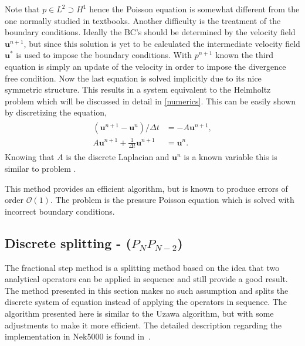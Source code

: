 Note that $p\in L^2\supset H^1$ hence the Poisson equation 
is somewhat different from the one normally studied in textbooks. Another difficulty is the 
treatment of the boundary conditions. Ideally the BC's should be determined by the velocity 
field $\mathbf{u}^{n+1}$, but since this solution is yet to be calculated the intermediate velocity field 
$\mathbf{u}^{*}$ is used to impose the boundary conditions. With $p^{n+1}$ known the third equation is 
simply an update of the velocity in order to impose the divergence free condition. Now the last
equation is solved implicitly due to its nice symmetric structure. This results in a system 
equivalent to the Helmholtz problem which will be discussed in detail in \cref{numerics}.
This can be easily shown by discretizing the equation, 
\begin{align}
    \begin{split}
    (\mathbf{u}^{n+1}-\mathbf{u}^{n})/\Delta t  &= -A\mathbf{u}^{n+1},\\
    A\mathbf{u}^{n+1}+\frac{1}{\Delta t} \mathbf{u}^{n+1} &= \mathbf{u}^{n}.
    \end{split}
    \label{eq:fracHelm}
\end{align}
Knowing that $A$ is the discrete Laplacian and $\mathbf{u}^n$ is a known variable this is 
similar to problem .


This method provides an efficient algorithm, but is known to produce errors of order
$\mathcal{O}(1)$.
The problem is the pressure Poisson equation which is solved with incorrect boundary 
conditions.

\subsection{Discrete splitting - ($P_NP_{N-2}$)} \label{prescorr}
The fractional step method is a splitting method based on the idea that two analytical 
operators can be applied in sequence and still provide a good result. The method presented 
in this section makes no such assumption and splits the discrete system of equation instead 
of applying the operators in sequence. The algorithm presented here is similar to the Uzawa
algorithm, but with some adjustments to make it more efficient. The detailed 
description regarding the implementation in Nek5000 is found
in~\cite{Fischer_hybridschwarz-multigrid}.

